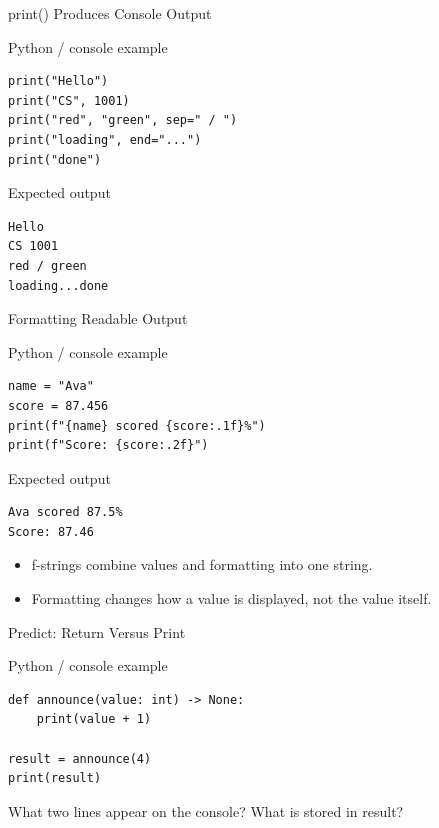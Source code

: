 \documentclass[aspectratio=169,10pt]{beamer}
\begin{document}
\begin{frame}[fragile]{print() Produces Console Output}
\begin{block}{Python / console example}\begin{Verbatim}[fontsize=\footnotesize]
print("Hello")
print("CS", 1001)
print("red", "green", sep=" / ")
print("loading", end="...")
print("done")
\end{Verbatim}
\end{block}
\begin{block}{Expected output}\begin{Verbatim}[fontsize=\footnotesize]
Hello
CS 1001
red / green
loading...done
\end{Verbatim}
\end{block}
\end{frame}
\begin{frame}[fragile]{Formatting Readable Output}
\begin{block}{Python / console example}\begin{Verbatim}[fontsize=\footnotesize]
name = "Ava"
score = 87.456
print(f"{name} scored {score:.1f}%")
print(f"Score: {score:.2f}")
\end{Verbatim}
\end{block}
\begin{block}{Expected output}\begin{Verbatim}[fontsize=\footnotesize]
Ava scored 87.5%
Score: 87.46
\end{Verbatim}
\end{block}
\begin{itemize}
\item f-strings combine values and formatting into one string.
\item Formatting changes how a value is displayed, not the value itself.
\end{itemize}
\end{frame}
\begin{frame}[fragile]{Predict: Return Versus Print}
\begin{block}{Python / console example}\begin{Verbatim}[fontsize=\footnotesize]
def announce(value: int) -> None:
    print(value + 1)

result = announce(4)
print(result)
\end{Verbatim}
\end{block}
\begin{activity}What two lines appear on the console? What is stored in result?\end{activity}
\end{frame}
\end{document}
